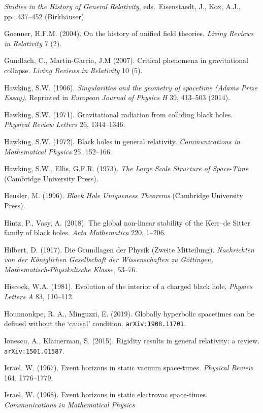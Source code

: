 \documentclass[11pt,a4paper]{article}
\begin{document}
\begin{small}
\begin{thebibliography}{99}
 \emph{Studies in the History of General Relativity}, eds.\  Eisenstaedt, J., Kox, A.J., pp.\ 437--452
 (Birkh\"{a}user). 
\item[] Goenner, H.F.M. (2004). On the history of unified field theories. \emph{Living Reviews in Relativity} 7 (2).
\item[]  Gundlach, C., Martin-Garcia, J.M (2007).  Critical phenomena in gravitational collapse.
 \emph{Living Reviews in Relativity} 10 (5).
\item[]  Hawking, S.W. (1966). \emph{Singularities and the geometry of spacetime (Adams Prize Essay)}.
Reprinted in   \emph{European Journal of Physics H} 39, 413--503 (2014). 
\item[]  Hawking, S.W. (1971). Gravitational radiation from colliding black holes. \emph{Physical Review Letters}
26, 1344--1346.
\item[]  Hawking, S.W. (1972). Black holes in general relativity. \emph{Communications in Mathematical Physics}
25, 152--166.
\item[]  Hawking, S.W.,  Ellis,  G.F.R. (1973). \emph{The Large Scale Structure of Space-Time} (Cambridge University Press). 
\item[]  Heusler, M. (1996). \emph{Black Hole Uniqueness Theorems}  (Cambridge University Press). 
 \item[] Hintz, P.,  Vasy, A. (2018). 
The global non-linear stability of the Kerr--de Sitter family of black holes.
\emph{ Acta Mathematica} 220, 1--206. 
\item [] Hilbert, D. (1917). Die  Grundlagen der Physik (Zweite Mitteilung). 
 \emph{Nachrichten von der K\"{o}niglichen Gesellschaft der Wissenschaften zu G\"{o}ttingen, Mathematisch-Physikalische Klasse}, 53--76. 
 \item[] Hiscock, W.A. (1981). Evolution of the interior of a charged black hole.
\emph{Physics Letters A} 83, 110--112.
 \item[] Hounnonkpe, R. A., Minguzzi, E. (2019). Globally hyperbolic spacetimes can be defined without the `causal' condition.
\texttt{arXiv:1908.11701}.
 \item[] Ionescu, A.,  Klainerman, S. (2015). Rigidity results in general relativity: a review. \texttt{arXiv:1501.01587}.
 \item[] Israel, W. (1967). Event horizons in static vacuum space-times. \emph{Physical Review} 164, 1776--1779. 
  \item[] Israel, W. (1968).  Event horizons in static electrovac space-times. \emph{Communications in Mathematical Physics}

\end{thebibliography}
\end{small}
\end{document}
